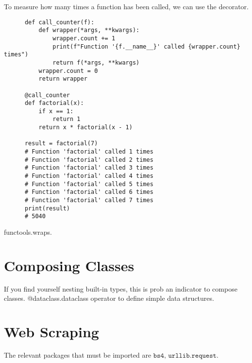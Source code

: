 \documentclass{article}
\begin{document}
  \begin{example}
    To measure how many times a function has been called, we can use the decorator. 
    \begin{lstlisting}
      def call_counter(f):
          def wrapper(*args, **kwargs):
              wrapper.count += 1
              print(f"Function '{f.__name__}' called {wrapper.count} times")
              return f(*args, **kwargs)
          wrapper.count = 0
          return wrapper

      @call_counter
      def factorial(x): 
          if x == 1: 
              return 1 
          return x * factorial(x - 1)

      result = factorial(7)
      # Function 'factorial' called 1 times
      # Function 'factorial' called 2 times
      # Function 'factorial' called 3 times
      # Function 'factorial' called 4 times
      # Function 'factorial' called 5 times
      # Function 'factorial' called 6 times
      # Function 'factorial' called 7 times
      print(result)       
      # 5040
    \end{lstlisting}
  \end{example}

  functools.wraps. 

\section{Composing Classes}

  If you find yourself nesting built-in types, this is prob an indicator to compose classes. @dataclass.dataclass operator to define simple data structures. 

\section{Web Scraping}

  The relevant packages that must be imported are $\texttt{bs4, urllib.request}$. 
\end{document}
